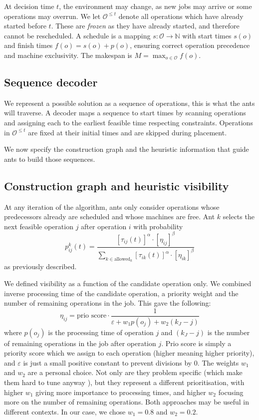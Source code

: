 \documentclass[final-report]{report-template}
\begin{document}
At decision time $t$, the environment may change, as new jobs may arrive or some operations may overrun. We let $\mathcal{O}^{\le t}$ denote all operations which have already started before $t$. These are \emph{frozen} as they have already started, and therefore cannot be rescheduled. A schedule is a mapping $s: \mathcal{O} \to \mathbb{N}$ with start times $s(o)$ and finish times $f(o) = s(o) + p(o)$, ensuring correct operation precedence and machine exclusivity. The makespan is $M = \max_{o\in\mathcal{O}} f(o)$.

\subsection{Sequence decoder}
We represent a possible solution as a sequence of operations, this is what the ants will traverse. A decoder maps a sequence to start times by scanning operations and assigning each to the earliest feasible time respecting constraints. Operations in $\mathcal{O}^{\le t}$ are fixed at their initial times and are skipped during placement.

We now specify the construction graph and the heuristic information that guide ants to build those sequences.

\subsection{Construction graph and heuristic visibility}
At any iteration of the algorithm, ants only consider operations whose predecessors already are scheduled and whose machines are free. Ant $k$ selects the next feasible operation $j$ after operation $i$ with probability
\begin{equation*}
    p_{ij}^k(t) = \frac{\left[\tau_{ij}(t)\right]^\alpha \cdot \left[\eta_{ij}\right]^\beta}{\sum_{k \in \text{allowed}_k}\left[\tau_{ik}(t)\right]^\alpha \cdot \left[\eta_{ik}\right]^\beta}
\end{equation*}
as previously described.

We defined visibility as a function of the candidate operation only. We combined inverse processing time of the candidate operation, a priority weight and the number of remaining operations in the job. This gave the following:
\[
\eta_{ij} = \text{prio score} \cdot \frac{1}{\varepsilon + w_1p(o_j) + w_2 (k_J - j)}
\]
where $p(o_j)$ is the processing time of operation $j$ and $(k_J - j)$ is the number of remaining operations in the job after operation $j$. Prio score is simply a priority score which we assign to each operation (higher meaning higher priority), and $\varepsilon$ is just a small positive constant to prevent divisions by 0. The weights $w_1$ and $w_2$ are a personal choice. Not only are they problem specific (which make them hard to tune anyway \cite{ant_parameters}), but they represent a different prioritisation, with higher $w_1$ giving more importance to processing times, and higher $w_2$ focusing more on the number of remaining operations. Both approaches may be useful in different contexts. In our case, we chose $w_1 = 0.8$ and $w_2 = 0.2$.
\end{document}
